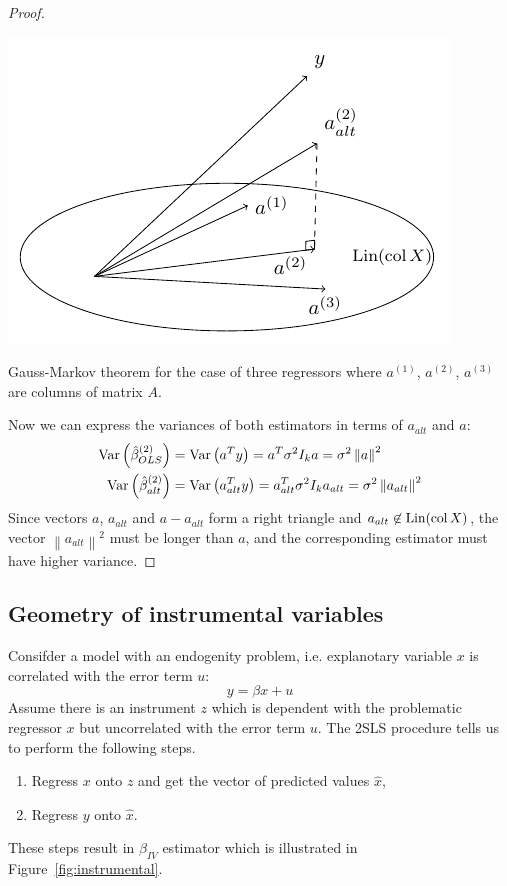 \begin{proof}
\begin{marginfigure}[1\baselineskip]
\includegraphics[scale=0.7]{figures/02_gmt.pdf}
\label{fig:gmt}
\caption{Gauss-Markov theorem for the case of three regressors
where $a^{(1)}$, $a^{(2)}$, $a^{(3)}$ are columns of matrix $A$.}
\end{marginfigure}

Now we can express the variances of both estimators in terms of $a_{alt}$ and $a$:
\begin{align*}
\operatorname{Var}\left(\hat{\beta}^{(2)}_{OLS}\right) &= \operatorname{Var}\left(a^T y\right) = a^T \sigma^2 I_{k} a = \sigma^2 \left\lVert a \right\rVert^2 \\
\operatorname{Var}\left(\hat{\beta}^{(2)}_{alt}\right) &= \operatorname{Var}\left(a^T_{alt} y\right) =  a^T_{alt} \sigma^2 I_{k} a_{alt} = \sigma^2 \left\lVert a_{alt} \right\rVert^2
\end{align*}
Since vectors $a$, $a_{alt}$ and $a - a_{alt}$
form a right triangle and $a_{alt} \not \in \operatorname{Lin}(\operatorname{col} X)$,
the vector $\left\lVert a_{alt} \right\rVert^2$ must be longer than $a$,
and the corresponding estimator must have higher variance.

\end{proof}

\vspace{1cm}

\subsection{Geometry of instrumental variables}

Consifder a model with an endogenity problem, i.e. explanotary variable $x$
is correlated with the error term $u$:
\[
y = \beta x + u
\]
Assume there is an instrument $z$ which is dependent with the problematic regressor $x$
but uncorrelated with the error term $u$.
The 2SLS procedure tells us to perform the following steps.
\begin{enumerate}
  \item Regress $x$ onto $z$ and get the vector of predicted values $\hat x$,
  \item Regress $y$ onto $\hat x$.
\end{enumerate}
These steps result in $\beta_{IV}$ estimator which is illustrated in Figure~\ref{fig:instrumental}.

